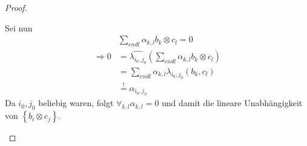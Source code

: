 \documentclass[12pt,a4paper]{article}
\theoremstyle{definition}
\theoremstyle{remark}
\renewcommand{\hat}[1]{\widehat{#1}}
\begin{document}
\begin{proof}
\begin{enumerate}
\begin{center}
					\end{center}
					Sei nun
					\begin{equation}
						\begin{split}
							& \sum_{endl} \alpha_{k,l} b_k \otimes c_l = 0 \\
							\Rightarrow 0 &= \hat{\lambda_{i_0,j_0}}\left( \sum_{endl} \alpha_{k,l} b_k \otimes c_l \right) \\
							&= \sum_{endl} \alpha_{k,l} \lambda_{i_0,j_0}(b_k,c_l) \\
							& \overset{!}{=} \alpha_{i_0,j_0}
						\end{split}
					\end{equation}
					Da $i_0,j_0$ beliebig waren, folgt $\forall_{k,l} \alpha_{k,l} =0$ und damit die lineare Unabhängigkeit von $\left\{ b_i \otimes c_j \right\}$.
			\end{enumerate}
		\end{proof}
\end{document}
